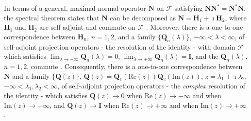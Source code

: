 \documentclass[11pt]{amsart}
\newcommand{\Hb}{\mathbf{H}}
\newcommand{\Ib}{\mathbf{I}}
\newcommand{\Qb}{\mathbf{Q}}
\newcommand{\Nb}{\mathbf{N}}
\newcommand{\Fs}{\mathscr{F}}
\begin{document}
In terms of a general, maximal normal operator $\Nb$ on $\Fs$
satisfying $\Nb\Nb^*=\Nb^*\Nb$, the spectral theorem states that $\Nb$ can
be decomposed as $\Nb=\Hb_1+\imath\Hb_2$, where $\Hb_1$ and $\Hb_2$ are
self-adjoint and commute on $\Fs$ \cite{Stone:64}. Moreover, there is
a one-to-one correspondence between $\Hb_n$, $n=1,2$, and a family
$\{\Qb_n(\lambda)\}$, $-\infty<\lambda<\infty$, of self-adjoint projection operators - the
resolution of the identity - with domain $\Fs$ which satisfies
$\lim_{\lambda\to-\infty}\Qb_n(\lambda)=0$, $\lim_{\lambda\to+\infty}\Qb_n(\lambda)=\Ib$, and the
$\Qb_n(\lambda)$, $n=1,2$, commute \cite{Reed-1980,Stone:64}. Consequently,
there is a one-to-one correspondence between $\Nb$ and a family
$\{\Qb(z)\}$, 
$\Qb(z)=\Qb_1(\text{Re}(z))\Qb_2(\text{Im}(z))$, $z=\lambda_1+\imath\lambda_2$,
$-\infty<\lambda_1,\lambda_2<\infty$, of self-adjoint projection operators - the
\emph{complex} resolution of the identity - which satisfies $\Qb(z)\to0$
when $\text{Re}(z)\to-\infty$  and when $\text{Im}(z)\to-\infty$, and $\Qb(z)\to\Ib$
when $\text{Re}(z)\to+\infty$ and when $\text{Im}(z)\to+\infty$ \cite{Stone:64}.
\end{document}
